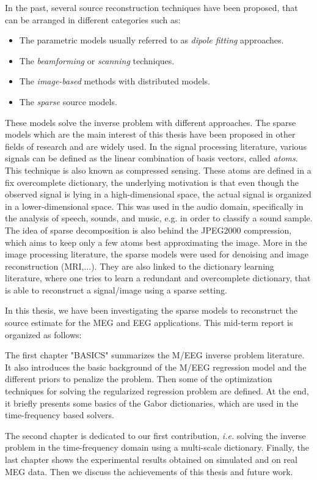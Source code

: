 In the past, several source reconstruction techniques have been proposed, that can be arranged in different categories such as:
\begin{itemize}
	\item The parametric models usually referred to as \textit{dipole fitting} approaches.
    \item The \textit{beamforming} or \textit{scanning} techniques.
    \item The \textit{image-based} methods with distributed models.
    \item The \textit{sparse} source models.
\end{itemize}
These models solve the inverse problem with different approaches. The sparse models which are the main interest of this thesis have been proposed in other fields of research and are widely used. In the signal processing literature, various signals can be defined as the linear combination of basis vectors, called \textit{atoms}. This technique is also known as compressed sensing. These atoms are defined in a fix overcomplete dictionary, the underlying motivation is that even though the observed signal is lying in a high-dimensional space, the actual signal is organized in a lower-dimensional space. This was used in the audio domain, specifically in the analysis of speech, sounds, and music, e.g. in order to classify a sound sample. The idea of sparse decomposition is also behind the JPEG2000 compression, which aims to keep only a few atoms best approximating the image. More in the image processing literature, the sparse models were used for denoising and image reconstruction (MRI,...). They are also linked to the dictionary learning literature, where one tries to learn a redundant and overcomplete dictionary, that is able to reconstruct a signal/image using a sparse setting.

In this thesis, we have been investigating the sparse models to reconstruct the source estimate for the MEG and EEG applications. This mid-term report is organized as follows:

The first chapter "BASICS" summarizes the M/EEG inverse problem literature. It also introduces the basic background of the M/EEG regression model and the different priors to penalize the problem. Then some of the optimization techniques for solving the regularized regression problem are defined. At the end, it briefly presents some basics of the Gabor dictionaries, which are used in the time-frequency based solvers.

The second chapter is dedicated to our first contribution, \textit{i.e.} solving the inverse problem in the time-frequency domain using a multi-scale dictionary. 
Finally, the last chapter shows the experimental results obtained on simulated and on real MEG data. Then we discuss the achievements of this thesis and future work. 
